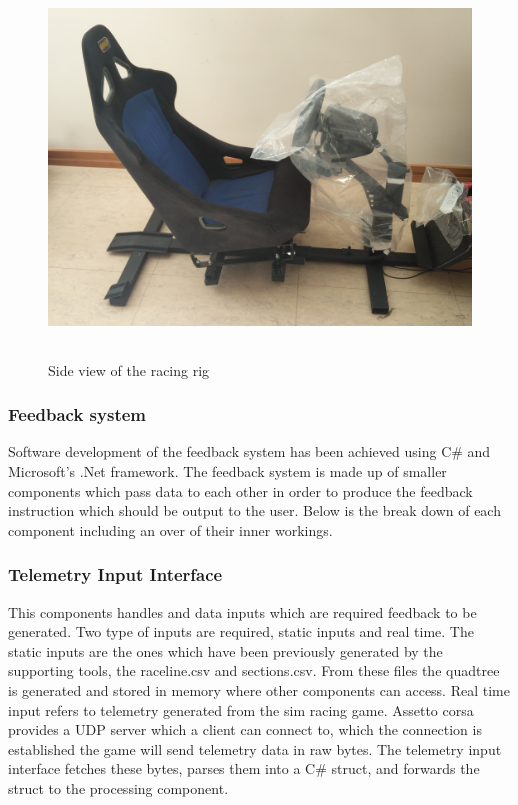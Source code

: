 \begin{figure}[!htb]
	\centering
	\includegraphics[height=10cm]{images/RacingRig}
	\caption{Side view of the racing rig}
	\label{fig:RacingRig}
\end{figure}

\subsubsection{Feedback system}
Software development of the feedback system has been achieved using C\# and Microsoft's .Net framework. The feedback system is made up of smaller components which pass data to each other in order to produce the feedback instruction which should be output to the user. Below is the break down of each component including an over of their inner workings.

\subsubsection{Telemetry Input Interface}
This components handles and data inputs which are required feedback to be generated. Two type of inputs are required, static inputs and real time. The static inputs are the ones which have been previously generated by the supporting tools, the raceline.csv and sections.csv. From these files the quadtree is generated and stored in memory where other components can access. Real time input refers to telemetry generated from the sim racing game. Assetto corsa provides a UDP server which a client can connect to, which the connection is established the game will send telemetry data in raw bytes. The telemetry input interface fetches these bytes, parses them into a C\# struct, and forwards the struct to the processing component.

